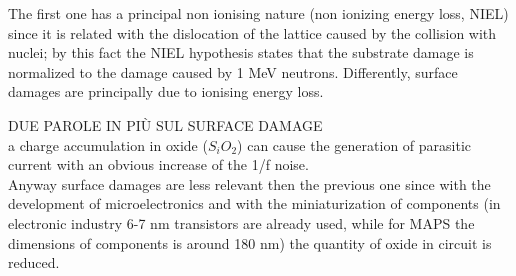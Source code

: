       The first one has a principal non ionising nature (non ionizing energy loss, NIEL) since it is related with the dislocation of the lattice caused by the collision with nuclei; by this fact the NIEL hypothesis states that the substrate damage is normalized to the damage caused by 1 MeV neutrons. Differently, surface damages are principally due to ionising energy loss.

      DUE PAROLE IN PIÙ SUL SURFACE DAMAGE\\
      a charge accumulation in oxide ($S_iO_2$) can cause the generation of parasitic current with an obvious increase of the 1/f noise.\\
      Anyway surface damages are less relevant then the previous one since with the development of microelectronics and with the miniaturization of components (in electronic industry 6-7 nm transistors are already used, while for MAPS the dimensions of components is around 180 nm) the quantity of oxide in circuit is reduced.

